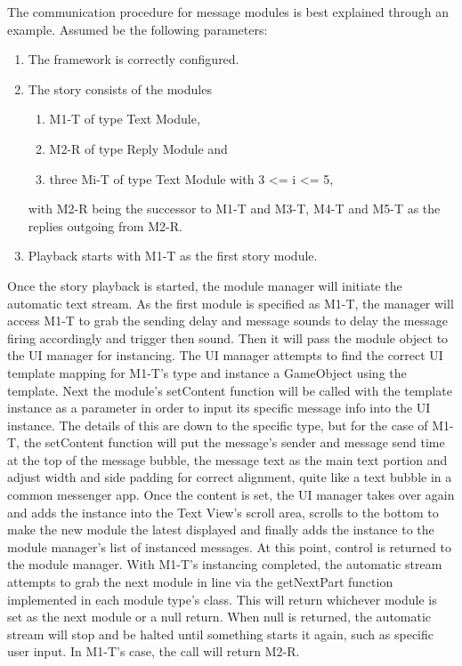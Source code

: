 The communication procedure for message modules is best explained through an example. Assumed be the following parameters: 
\begin{enumerate}
\item The framework is correctly configured. 
\item The story consists of the modules 
	\begin{enumerate}
	\item M1-T of type Text Module, 
	\item M2-R of type Reply Module and 
	\item three Mi-T of type Text Module with 3 <= i <= 5, 
	\end{enumerate}
with M2-R being the successor to M1-T and M3-T, M4-T and M5-T as the replies outgoing from M2-R. 
\item Playback starts with M1-T as the first story module.
\end{enumerate}
Once the story playback is started, the module manager will initiate the automatic text stream. As the first module is specified as M1-T, the manager will access M1-T to grab the sending delay and message sounds to delay the message firing accordingly and trigger then sound. Then it will pass the module object to the UI manager for instancing. 
The UI manager attempts to find the correct UI template mapping for M1-T's type and instance a GameObject using the template. Next the module's setContent function will be called with the template instance as a parameter in order to input its specific message info into the UI instance. The details of this are down to the specific type, but for the case of M1-T, the setContent function will put the message's sender and message send time at the top of the message bubble, the message text as the main text portion and adjust width and side padding for correct alignment, quite like a text bubble in a common messenger app. Once the content is set, the UI manager takes over again and adds the instance into the Text View's scroll area, scrolls to the bottom to make the new module the latest displayed and finally adds the instance to the module manager's list of instanced messages.
At this point, control is returned to the module manager. With M1-T's instancing completed, the automatic stream attempts to grab the next module in line via the getNextPart function implemented in each module type's class. This will return whichever module is set as the next module or a null return. When null is returned, the automatic stream will stop and be halted until something starts it again, such as specific user input. In M1-T's case, the call will return M2-R. 
